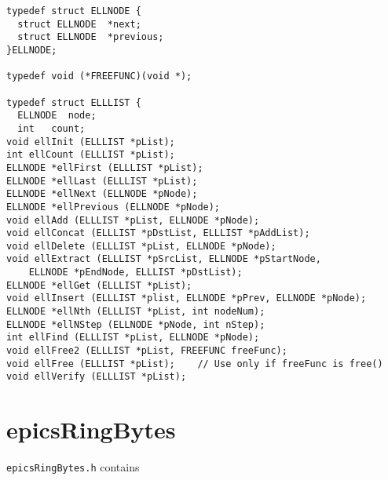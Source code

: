 \begin{verbatim}typedef struct ELLNODE {
  struct ELLNODE  *next;
  struct ELLNODE  *previous;
}ELLNODE;

typedef void (*FREEFUNC)(void *);

typedef struct ELLLIST {
  ELLNODE  node;
  int   count;
void ellInit (ELLLIST *pList);
int ellCount (ELLLIST *pList);
ELLNODE *ellFirst (ELLLIST *pList);
ELLNODE *ellLast (ELLLIST *pList);
ELLNODE *ellNext (ELLNODE *pNode);
ELLNODE *ellPrevious (ELLNODE *pNode);
void ellAdd (ELLLIST *pList, ELLNODE *pNode);
void ellConcat (ELLLIST *pDstList, ELLLIST *pAddList);
void ellDelete (ELLLIST *pList, ELLNODE *pNode);
void ellExtract (ELLLIST *pSrcList, ELLNODE *pStartNode,
    ELLNODE *pEndNode, ELLLIST *pDstList);
ELLNODE *ellGet (ELLLIST *pList);
void ellInsert (ELLLIST *plist, ELLNODE *pPrev, ELLNODE *pNode);
ELLNODE *ellNth (ELLLIST *pList, int nodeNum);
ELLNODE *ellNStep (ELLNODE *pNode, int nStep);
int ellFind (ELLLIST *pList, ELLNODE *pNode);
void ellFree2 (ELLLIST *pList, FREEFUNC freeFunc);
void ellFree (ELLLIST *pList);    // Use only if freeFunc is free()
void ellVerify (ELLLIST *pList);
\end{verbatim}
\section{epicsRingBytes}

\verb|epicsRingBytes.h| contains

